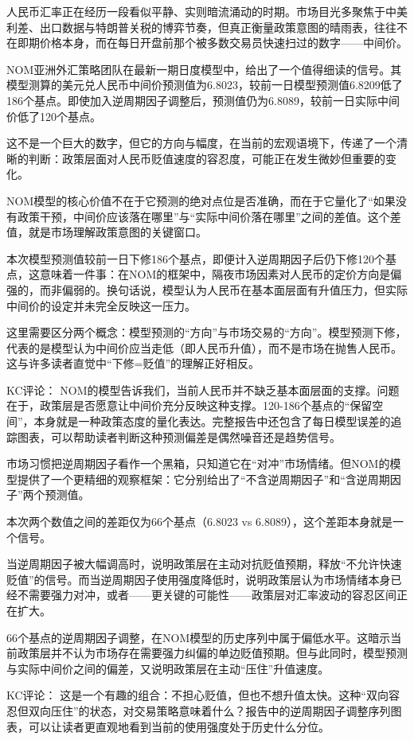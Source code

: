 \documentclass[11pt]{ctexart}
\begin{document}
人民币汇率正在经历一段看似平静、实则暗流涌动的时期。市场目光多聚焦于中美利差、出口数据与特朗普关税的博弈节奏，但真正衡量政策意图的晴雨表，往往不在即期价格本身，而在每日开盘前那个被多数交易员快速扫过的数字——中间价。

NOM亚洲外汇策略团队在最新一期日度模型中，给出了一个值得细读的信号。其模型测算的美元兑人民币中间价预测值为6.8023，较前一日模型预测值6.8209低了186个基点。即使加入逆周期因子调整后，预测值仍为6.8089，较前一日实际中间价低了120个基点。

这不是一个巨大的数字，但它的方向与幅度，在当前的宏观语境下，传递了一个清晰的判断：政策层面对人民币贬值速度的容忍度，可能正在发生微妙但重要的变化。

NOM模型的核心价值不在于它预测的绝对点位是否准确，而在于它量化了“如果没有政策干预，中间价应该落在哪里”与“实际中间价落在哪里”之间的差值。这个差值，就是市场理解政策意图的关键窗口。

本次模型预测值较前一日下修186个基点，即便计入逆周期因子后仍下修120个基点，这意味着一件事：在NOM的框架中，隔夜市场因素对人民币的定价方向是偏强的，而非偏弱的。换句话说，模型认为人民币在基本面层面有升值压力，但实际中间价的设定并未完全反映这一压力。

这里需要区分两个概念：模型预测的“方向”与市场交易的“方向”。模型预测下修，代表的是模型认为中间价应当走低（即人民币升值），而不是市场在抛售人民币。这与许多读者直觉中“下修=贬值”的理解正好相反。

KC评论： NOM的模型告诉我们，当前人民币并不缺乏基本面层面的支撑。问题在于，政策层是否愿意让中间价充分反映这种支撑。120-186个基点的“保留空间”，本身就是一种政策态度的量化表达。完整报告中还包含了每日模型误差的追踪图表，可以帮助读者判断这种预测偏差是偶然噪音还是趋势信号。

市场习惯把逆周期因子看作一个黑箱，只知道它在“对冲”市场情绪。但NOM的模型提供了一个更精细的观察框架：它分别给出了“不含逆周期因子”和“含逆周期因子”两个预测值。

本次两个数值之间的差距仅为66个基点（6.8023 vs 6.8089），这个差距本身就是一个信号。

当逆周期因子被大幅调高时，说明政策层在主动对抗贬值预期，释放“不允许快速贬值”的信号。而当逆周期因子使用强度降低时，说明政策层认为市场情绪本身已经不需要强力对冲，或者——更关键的可能性——政策层对汇率波动的容忍区间正在扩大。

66个基点的逆周期因子调整，在NOM模型的历史序列中属于偏低水平。这暗示当前政策层并不认为市场存在需要强力纠偏的单边贬值预期。但与此同时，模型预测与实际中间价之间的偏差，又说明政策层在主动“压住”升值速度。

KC评论： 这是一个有趣的组合：不担心贬值，但也不想升值太快。这种“双向容忍但双向压住”的状态，对交易策略意味着什么？报告中的逆周期因子调整序列图表，可以让读者更直观地看到当前的使用强度处于历史什么分位。
\end{document}
